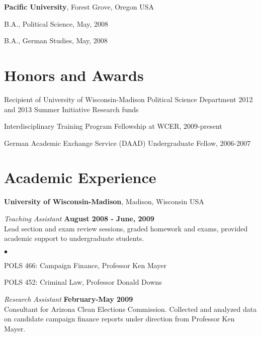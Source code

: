 \documentclass[margin,line]{res}
\newenvironment{list1}{
  \begin{list}{\ding{113}}{%
      \setlength{\itemsep}{0in}
      \setlength{\parsep}{0in} \setlength{\parskip}{0in}
      \setlength{\topsep}{0in} \setlength{\partopsep}{0in} 
      \setlength{\leftmargin}{0.17in}}}{\end{list}}
\newenvironment{list2}{
  \begin{list}{$\bullet$}{%
      \setlength{\itemsep}{0in}
      \setlength{\parsep}{0in} \setlength{\parskip}{0in}
      \setlength{\topsep}{0in} \setlength{\partopsep}{0in} 
      \setlength{\leftmargin}{0.2in}}}{\end{list}}
\begin{document}
\begin{resume}
{\bf Pacific University}, Forest Grove, Oregon USA\\
\vspace*{-.1in}
\begin{list1}
\item[] B.A., Political Science,  May, 2008
\item[] B.A., German Studies, May, 2008
\end{list1}


\section{\sc Honors and Awards} 
Recipient of University of Wisconsin-Madison Political Science Department 2012 and 2013 Summer Initiative Research funds

\vspace*{-2.5mm}
Interdisciplinary Training Program Fellowship at WCER, 2009-present


\vspace*{-2.5mm}
German Academic Exchange Service (DAAD) Undergraduate Fellow, 2006-2007



\section{\sc Academic Experience}
{\bf University of Wisconsin-Madison}, Madison, Wisconsin USA

\vspace{-.1cm}
{\em Teaching Assistant} \hfill {\bf August 2008 - June, 2009}\\
Lead section and exam review sessions, graded homework and exams, provided academic support to undergraduate students.
\vspace*{.05in}  
\begin{list2}
\item POLS 466: Campaign Finance, Professor Ken Mayer
\item POLS 452: Criminal Law, Professor Donald Downs
\end{list2}


{\em Research Assistant} \hfill {\bf February-May 2009}\\
Consultant for Arizona Clean Elections Commission. Collected and analyzed data on candidate campaign finance reports under direction from Professor Ken Mayer. 
\vspace*{.05in}  



\end{resume}
\end{document}
